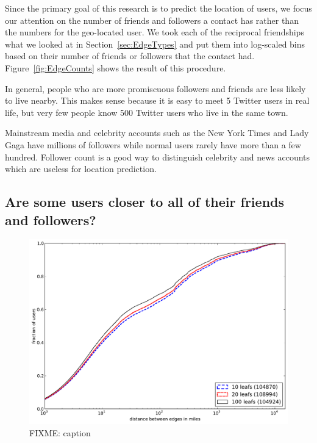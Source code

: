 
Since the primary goal of this research is to predict the location of users, we
focus our attention on the number of friends and followers a contact has rather
than the numbers for the geo-located user.
We took each of the reciprocal friendships what we looked at in
Section~\ref{sec:EdgeTypes} and put them into log-scaled bins based on their
number of friends or followers that the contact had.
Figure~\ref{fig:EdgeCounts} shows the result of this procedure.

In general, people who are more promiscuous followers and friends are less
likely to live nearby. This makes sense because it is easy to meet 5 Twitter
users in real life, but very few people know 500 Twitter users who live in the
same town.

Mainstream media and celebrity accounts such as the New York Times and Lady
Gaga have millions of followers while normal users rarely have more than a few
hundred.
Follower count is a good way to distinguish celebrity and news accounts which
are useless for location prediction.

\subsection{Are some users closer to all of their friends and followers?}

\begin{figure}[tb]
\centering
\includegraphics[width=\linewidth]{figures/locals_cmp.pdf}
\caption{
    FIXME: caption
}
\label{fig:LocalCmp}
\end{figure}

